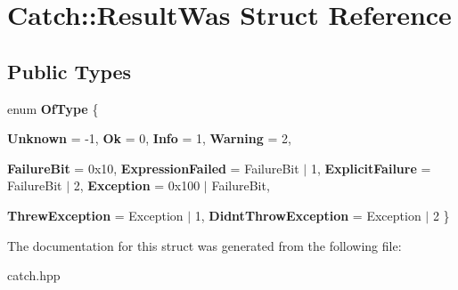 \hypertarget{structCatch_1_1ResultWas}{
\section{Catch::ResultWas Struct Reference}
\label{structCatch_1_1ResultWas}
}
\subsection*{Public Types}
\begin{DoxyCompactItemize}
\item 
enum {\bfseries OfType} \{ \par
{\bfseries Unknown} =  -\/1, 
{\bfseries Ok} =  0, 
{\bfseries Info} =  1, 
{\bfseries Warning} =  2, 
\par
{\bfseries FailureBit} =  0x10, 
{\bfseries ExpressionFailed} =  FailureBit $|$ 1, 
{\bfseries ExplicitFailure} =  FailureBit $|$ 2, 
{\bfseries Exception} =  0x100 $|$ FailureBit, 
\par
{\bfseries ThrewException} =  Exception $|$ 1, 
{\bfseries DidntThrowException} =  Exception $|$ 2
 \}
\end{DoxyCompactItemize}


The documentation for this struct was generated from the following file:\begin{DoxyCompactItemize}
\item 
catch.hpp\end{DoxyCompactItemize}
